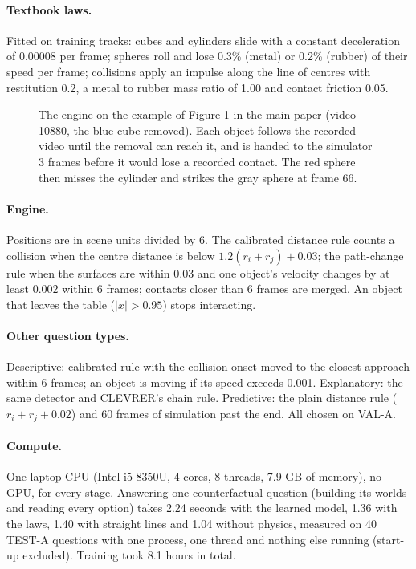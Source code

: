 \paragraph{Textbook laws.}
Fitted on training tracks: cubes and cylinders slide with a constant deceleration of 0.00008 per frame; spheres roll and lose 0.3\% (metal) or 0.2\% (rubber) of their speed per frame; collisions apply an impulse along the line of centres with restitution 0.2, a metal to rubber mass ratio of 1.00 and contact friction 0.05.

\begin{figure}[h]
\centering
{}
\caption{The engine on the example of Figure 1 in the main paper (video 10880, the blue cube removed). Each object follows the recorded video until the removal can reach it, and is handed to the simulator 3 frames before it would lose a recorded contact. The red sphere then misses the cylinder and strikes the gray sphere at frame 66.}
\label{fig:timeline}
\end{figure}

\paragraph{Engine.}
Positions are in scene units divided by 6.
The calibrated distance rule counts a collision when the centre distance is below $1.2(r_i + r_j) + 0.03$; the path-change rule when the surfaces are within 0.03 and one object's velocity changes by at least 0.002 within 6 frames; contacts closer than 6 frames are merged.
An object that leaves the table ($|x| > 0.95$) stops interacting.

\paragraph{Other question types.}
Descriptive: calibrated rule with the collision onset moved to the closest approach within 6 frames; an object is moving if its speed exceeds 0.001. Explanatory: the same detector and CLEVRER's chain rule. Predictive: the plain distance rule ($r_i + r_j + 0.02$) and 60 frames of simulation past the end. All chosen on VAL-A.

\paragraph{Compute.}
One laptop CPU (Intel i5-8350U, 4 cores, 8 threads, 7.9 GB of memory), no GPU, for every stage.
Answering one counterfactual question (building its worlds and reading every option) takes 2.24 seconds with the learned model, 1.36 with the laws, 1.40 with straight lines and 1.04 without physics, measured on 40 TEST-A questions with one process, one thread and nothing else running (start-up excluded).
Training took 8.1 hours in total.

